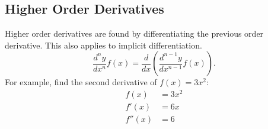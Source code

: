 \documentclass[12pt]{article}
\begin{document}
\subsection{Higher Order Derivatives}
Higher order derivatives are found by differentiating the previous order derivative. This also applies to implicit differentiation.
\[ \frac{d^n y}{dx^n} f(x) = \frac{d}{dx} \left( \frac{d^{n-1} y}{dx^{n-1}} f(x) \right). \]
For example, find the second derivative of $f(x) = 3x^2$:
\begin{align*}
	f(x) &= 3x^2 \\
	f'(x) &= 6x \\
	f''(x) &= 6
\end{align*}
\end{document}
